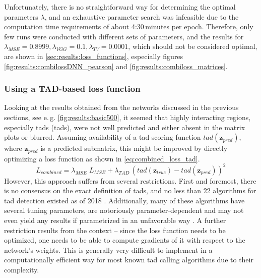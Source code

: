 Unfortunately, there is no straightforward way for determining the optimal parameters $\lambda$,
and an exhaustive parameter search was infeasible due to the computation time requirements of about 4:30\,minutes per epoch.
Therefore, only few runs were conducted with different sets of parameters,
and the results for $\lambda_\mathit{MSE} = 0.8999, \lambda_\mathit{VGG}=0.1, \lambda_\mathit{TV}=0.0001$,
which should not be considered optimal, are shown in \cref{sec:results:loss_functions}, especially figures \ref{fig:results:combilossDNN_pearson} and \ref{fig:results:combiloss_matrices}.

\subsubsection{Using a TAD-based loss function} \label{sec:improve:TAD_loss}
Looking at the results obtained from the networks discussed in the previous sections, see e.\,g. \cref{fig:results:basic500}, 
it seemed that highly interacting regions, especially \acrlong{tad}s (\acrshort{tad}s), were not well predicted and either absent
in the matrix plots or blurred.
Assuming availability of a \acrshort{tad} scoring function $\mathit{tad}(\mathbf{z}_\mathit{pred})$, where $\mathbf{z}_\mathit{pred}$ is a predicted submatrix,
this might be improved by directly optimizing a loss function as shown in \cref{eq:combined_loss_tad}.
\begin{equation}
 L_\mathit{combined} = \lambda_\mathit{MSE}\;L_\mathit{MSE} + \lambda_\mathit{TAD} \, (\mathit{tad}(\mathbf{z}_\mathit{true}) - \mathit{tad}(\mathbf{z}_\mathit{pred}))^2 \label{eq:combined_loss_tad}
\end{equation}
However, this approach suffers from several restrictions.
First and foremost, there is no consensus on the exact definition of \acrshort{tad}s, 
and no less than 22 algorithms for \acrshort{tad} detection existed as of 2018 \cite{Dali2017,Zufferey2018}.
Additionally, many of these algorithms have several tuning parameters, are notoriously parameter-dependent
and may not even yield any results if parametrized in an unfavorable way \cite{Zufferey2018}. 
A further restriction results from the context -- since the loss function needs to be optimized,
one needs to be able to compute gradients of it with respect to the network's weights.
This is generally very difficult to implement in a computationally efficient way for most known \acrshort{tad} calling algorithms
due to their complexity.


